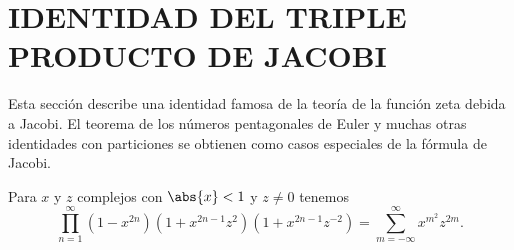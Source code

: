     \section{IDENTIDAD DEL TRIPLE PRODUCTO DE JACOBI}

    Esta sección describe una identidad famosa de la teoría de la función zeta debida a Jacobi.
    El teorema de los números pentagonales de Euler y muchas otras identidades con particiones
    se obtienen como casos especiales de la fórmula de Jacobi.

    \begin{teorema}\label{teo:14-6}
        Para $x$ y $z$ complejos con $\abs{x}<1$ y $z\neq0$ tenemos
        \begin{equation}\label{eq:14-13}
            \prod_{n=1}^{\infty}(1-x^{2n})(1+x^{2n-1}z^2)(1+x^{2n-1}z^{-2})=\sum_{m=-\infty}^{\infty}x^{m^2}z^{2m}.
        \end{equation}
    \end{teorema}


